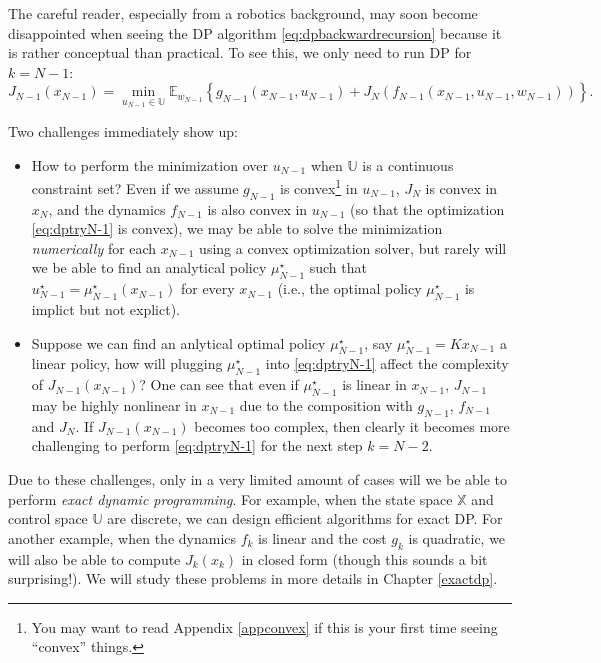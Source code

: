 \documentclass[
]{book}
\theoremstyle{definition}
\theoremstyle{definition}
\theoremstyle{definition}
\theoremstyle{definition}
\theoremstyle{remark}
\begin{document}
The careful reader, especially from a robotics background, may soon become disappointed when seeing the DP algorithm \eqref{eq:dpbackwardrecursion} because it is rather conceptual than practical. To see this, we only need to run DP for \(k=N-1\):
\begin{equation}
J_{N-1}(x_{N-1}) = \min_{u_{N-1} \in \mathbb{U}} \mathbb{E}_{w_{N-1}} \left\{ g_{N-1}(x_{N-1},u_{N-1}) + J_N(f_{N-1}(x_{N-1},u_{N-1},w_{N-1})) \right\}.
\label{eq:dptryN-1}
\end{equation}

Two challenges immediately show up:

\begin{itemize}
\item
  How to perform the minimization over \(u_{N-1}\) when \(\mathbb{U}\) is a continuous constraint set? Even if we assume \(g_{N-1}\) is convex\footnote{You may want to read Appendix \ref{appconvex} if this is your first time seeing ``convex'' things.} in \(u_{N-1}\), \(J_N\) is convex in \(x_{N}\), and the dynamics \(f_{N-1}\) is also convex in \(u_{N-1}\) (so that the optimization \eqref{eq:dptryN-1} is convex), we may be able to solve the minimization \emph{numerically} for each \(x_{N-1}\) using a convex optimization solver, but rarely will we be able to find an analytical policy \(\mu_{N-1}^\star\) such that \(u_{N-1}^\star = \mu_{N-1}^\star (x_{N-1})\) for every \(x_{N-1}\) (i.e., the optimal policy \(\mu_{N-1}^\star\) is implict but not explict).
\item
  Suppose we can find an anlytical optimal policy \(\mu_{N-1}^\star\), say \(\mu_{N-1}^\star = K x_{N-1}\) a linear policy, how will plugging \(\mu_{N-1}^\star\) into \eqref{eq:dptryN-1} affect the complexity of \(J_{N-1}(x_{N-1})\)? One can see that even if \(\mu_{N-1}^\star\) is linear in \(x_{N-1}\), \(J_{N-1}\) may be highly nonlinear in \(x_{N-1}\) due to the composition with \(g_{N-1}\), \(f_{N-1}\) and \(J_N\). If \(J_{N-1}(x_{N-1})\) becomes too complex, then clearly it becomes more challenging to perform \eqref{eq:dptryN-1} for the next step \(k=N-2\).
\end{itemize}

Due to these challenges, only in a very limited amount of cases will we be able to perform \emph{exact dynamic programming}. For example, when the state space \(\mathbb{X}\) and control space \(\mathbb{U}\) are discrete, we can design efficient algorithms for exact DP. For another example, when the dynamics \(f_k\) is linear and the cost \(g_k\) is quadratic, we will also be able to compute \(J_k(x_k)\) in closed form (though this sounds a bit surprising!). We will study these problems in more details in Chapter \ref{exactdp}.
\end{document}
